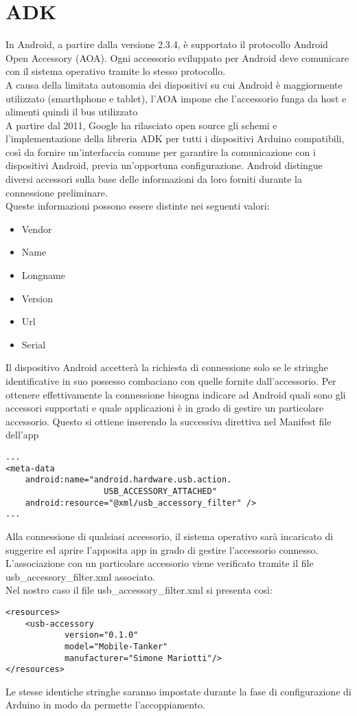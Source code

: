 \section {ADK}
In Android, a partire dalla versione 2.3.4, è supportato il protocollo Android Open 
Accessory (AOA). Ogni accessorio sviluppato per Android deve comunicare con il sistema operativo 
tramite lo stesso protocollo. 
\\A causa della limitata autonomia dei dispositivi su cui Android è maggiormente 
utilizzato (smarthphone e tablet), l'AOA impone che l'accessorio funga da host 
e alimenti quindi il bus utilizzato
\\A partire dal 2011, Google ha rilasciato open source gli schemi e l'implementazione 
della libreria ADK per tutti i dispositivi Arduino compatibili, così da fornire 
un'interfaccia comune per garantire la comunicazione con i dispositivi Android, 
previa un'opportuna configurazione. Android distingue diversi accessori 
sulla base delle informazioni da loro forniti durante la connessione preliminare. 
\\Queste informazioni possono essere distinte nei seguenti valori:
\begin{itemize}
\item Vendor
\item Name
\item Longname
\item Version
\item Url
\item Serial
\end{itemize} 
Il dispositivo Android accetterà la richiesta di connessione solo se le stringhe 
identificative in suo possesso combaciano con quelle fornite 
dall'accessorio. Per ottenere effettivamente la connessione bisogna indicare ad 
Android quali sono gli accessori supportati e quale applicazioni è in grado di 
gestire un particolare accessorio. Questo si ottiene inserendo la successiva 
direttiva nel Manifest file dell'app

\lstset{language=XML}

\begin{lstlisting}[caption=Porzione del Manifest file dell'app]
...
<meta-data
    android:name="android.hardware.usb.action.
    				USB_ACCESSORY_ATTACHED"
    android:resource="@xml/usb_accessory_filter" />
...
\end{lstlisting}
Alla connessione di qualsiasi accessorio, il sistema operativo sarà incaricato 
di suggerire ed aprire l'apposita app in grado di gestire l'accessorio connesso. 
L'associazione con un particolare accessorio viene verificato tramite il file 
usb\_accessory\_filter.xml associato.
\\Nel nostro caso il file usb\_accessory\_filter.xml si presenta così:
\begin{lstlisting}[caption=usb\_accessory\_filter.xml]
<resources>
    <usb-accessory
            version="0.1.0"
            model="Mobile-Tanker"
            manufacturer="Simone Mariotti"/>
</resources>
\end{lstlisting}
Le stesse identiche stringhe saranno impostate durante la fase di configurazione 
di Arduino in modo da permette l'accoppiamento.
